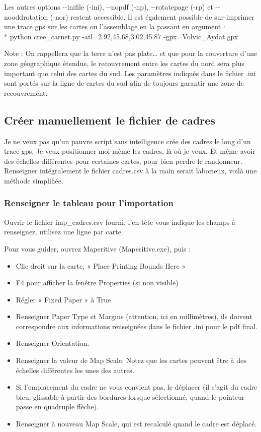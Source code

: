 \documentclass[12pt,french]{article}
\begin{document}
Les autres options -\mbox{}-inifile (-ini), -\mbox{}-nopdf (-np), -\mbox{}-rotatepage (-rp) et -\mbox{}-noodd\-ro\-tation (-nor) restent accessible. Il est également possible de sur-imprimer une trace gps sur les cartes ou l'assemblage en la passant en argument :\\*
python cree\_carnet.py -atl=2.92,45.68,3.02,45.87 -gpx=Volvic\_Aydat.gpx \par 
Note : On rappellera que la terre n'est pas plate… et que pour la couverture d'une zone géographique étendue, le recouvrement entre les cartes du nord sera plus important que celui des cartes du sud. Les paramètres indiqués dans le fichier .ini sont portés sur la ligne de cartes du sud afin de toujours garantir une zone de recouvrement.

\subsection{Créer manuellement le fichier de cadres}
\label{imp}
Je ne veux pas qu'un pauvre script sans intelligence crée des cadres le long d'un trace gps. Je veux positionner moi-même les cadres, là où je veux. Et même avoir des échelles différentes pour certaines cartes, pour bien perdre le randonneur.
Renseigner intégralement le fichier cadres.csv à la main serait laborieux, voilà une méthode simplifiée.\par 

\subsubsection{Renseigner le tableau pour l'importation}
Ouvrir le fichier imp\_cadres.csv fourni, l'en-tête vous indique les champs à renseigner, utilisez une ligne par carte. \par 
Pour vous guider, ouvrez Maperitive (Maperitive.exe), puis :
\begin{itemize}
\item Clic droit sur la carte, « Place Printing Bounds Here »
\item F4 pour afficher la fenêtre Properties (si non visible)
\item Régler « Fixed Paper » à True
\item Renseigner Paper Type et Margins (attention, ici en millimètres), ils doivent correspondre aux informations renseignées dans le fichier .ini pour le pdf final.
\item Renseigner Orientation.
\item Renseigner la valeur de Map Scale. Notez que les cartes peuvent être à des échelles différentes les unes des autres.
\item Si l'emplacement du cadre ne vous convient pas, le déplacer (il s'agit du cadre bleu, glissable à partir des bordures lorsque sélectionné, quand le pointeur passe en quadruple flèche).
\item Renseigner à nouveau Map Scale, qui est recalculé quand le cadre est déplacé.
\end{itemize}
\end{document}
